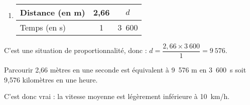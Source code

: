 \begin{enumerate}[itemsep=1em]
\begin{enumerate}
        \item \begin{tabular}{|l|c|c|}
        \hline
            Distance (en m) & 2,66 & $d$ \\
        \hline
            Temps (en s) & 1 & 3~600 \\
        \hline
        \end{tabular}
    \end{enumerate}
    
    \medskip
    C'est une situation de proportionnalité, donc : $d=\dfrac{2,66\times3~600}{1}=9~576$.
    
    \medskip
    Parcourir 2,66 mètres en une seconde est équivalent à 9~576 m en 3~600~s soit 9,576 kilomètres en une heure.
    
    \medskip
    C'est donc vrai : la vitesse moyenne est légèrement inférieure à 10~km/h.

\end{enumerate}
\medskip



